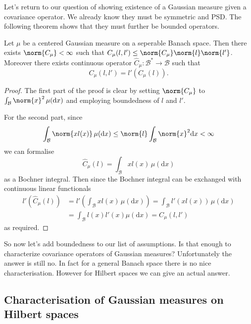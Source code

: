 \documentclass[fontsize=12pt, DIV=10]{scrreprt}
\theoremstyle{remark}
\newcommand{\calB}{\mathcal B}
\newcommand{\dif}[1]{\text{d} #1}
\begin{document}
Let's return to our question of showing existence of a Gaussian measure given a covariance operator. We already know they must be symmetric and PSD. The following theorem shows that they must further be bounded operators.
\begin{prop}
	\label{prop:bounded-cov}
	Let $\mu$ be a centered Gaussian measure on a seperable Banach space. Then there exists $\norm{C_{\mu}} < \infty$ such that $C_{\mu}(l, l') \leq \norm{C_{\mu}} \norm{l} \norm{l'}$. Moreover there exists continuous operator $\hat{C}_{\mu}: \calB^* \to \calB$ such that
	\begin{equation}
		C_{\mu}(l, l') = l'\left(C_{\mu}(l) \right).
	\end{equation}
\end{prop}
\begin{proof}
	The first part of the proof is clear by setting $\norm{C_{\mu}}$ to $\int_{\calB} \norm{x}^2 \, \mu(\dif x)$ and employing boundedness of $l$ and $l'$.

	For the second part, since
	\begin{equation}
		\int_{\calB} \norm{x l(x)} \, \mu(\dif x) \leq \norm{l} \int_{\calB} \norm{x}^2 \dif x < \infty
	\end{equation}
	we can formalise
	\begin{equation}
		\hat{C}_{\mu}(l) = \int_{\calB} x l(x) \, \mu(\dif x)
	\end{equation}
	as a Bochner integral. Then since the Bochner integral can be exchanged with continuous linear functionals
	\begin{align}
		l'(\hat{C}_{\mu}(l))
		&= l' \left( \int_{\calB} x l(x) \, \mu(\dif x)\right)
		= \int_{\calB} l'(x l(x)) \, \mu(\dif x) \nonumber \\
		&= \int_{\calB} l(x) l'(x) \mu(\dif x)
		= C_{\mu}(l, l')
	\end{align}
	as required.
\end{proof}
So now let's add boundedness to our list of assumptions. Is that enough to characterize covariance operators of Gaussian measures? Unfortunately the answer is still no. In fact for a general Banach space there is no nice characterisation. However for Hilbert spaces we can give an actual answer.

\subsection{Characterisation of Gaussian measures on Hilbert spaces}
\end{document}
